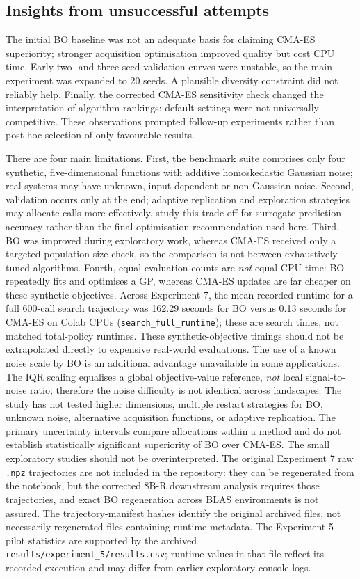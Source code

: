 \documentclass[11pt,a4paper]{article}
\begin{document}
\subsection{Insights from unsuccessful attempts}
The initial BO baseline was not an adequate basis for claiming CMA-ES superiority; stronger acquisition optimisation improved quality but cost CPU time. Early two- and three-seed validation curves were unstable, so the main experiment was expanded to 20 seeds. A plausible diversity constraint did not reliably help. Finally, the corrected CMA-ES sensitivity check changed the interpretation of algorithm rankings: default settings were not universally competitive. These observations prompted follow-up experiments rather than post-hoc selection of only favourable results.

There are four main limitations. First, the benchmark suite comprises only four synthetic, five-dimensional functions with additive homoskedastic Gaussian noise; real systems may have unknown, input-dependent or non-Gaussian noise. Second, validation occurs only at the end; adaptive replication and exploration strategies may allocate calls more effectively. \citet{binois2019} study this trade-off for surrogate prediction accuracy rather than the final optimisation recommendation used here. Third, BO was improved during exploratory work, whereas CMA-ES received only a targeted population-size check, so the comparison is not between exhaustively tuned algorithms. Fourth, equal evaluation counts are \emph{not} equal CPU time: BO repeatedly fits and optimises a GP, whereas CMA-ES updates are far cheaper on these synthetic objectives. Across Experiment 7, the mean recorded runtime for a full 600-call search trajectory was 162.29 seconds for BO versus 0.13 seconds for CMA-ES on Colab CPUs (\texttt{search\_full\_runtime}); these are search times, not matched total-policy runtimes. These synthetic-objective timings should not be extrapolated directly to expensive real-world evaluations. The use of a known noise scale by BO is an additional advantage unavailable in some applications. The IQR scaling equalises a global objective-value reference, \emph{not} local signal-to-noise ratio; therefore the noise difficulty is not identical across landscapes. The study has not tested higher dimensions, multiple restart strategies for BO, unknown noise, alternative acquisition functions, or adaptive replication. The primary uncertainty intervals compare allocations within a method and do not establish statistically significant superiority of BO over CMA-ES. The small exploratory studies should not be overinterpreted. The original Experiment 7 raw \texttt{.npz} trajectories are not included in the repository: they can be regenerated from the notebook, but the corrected 8B-R downstream analysis requires those trajectories, and exact BO regeneration across BLAS environments is not assured. The trajectory-manifest hashes identify the original archived files, not necessarily regenerated files containing runtime metadata. The Experiment 5 pilot statistics are supported by the archived \texttt{results/experiment\_5/results.csv}; runtime values in that file reflect its recorded execution and may differ from earlier exploratory console logs.
\end{document}
